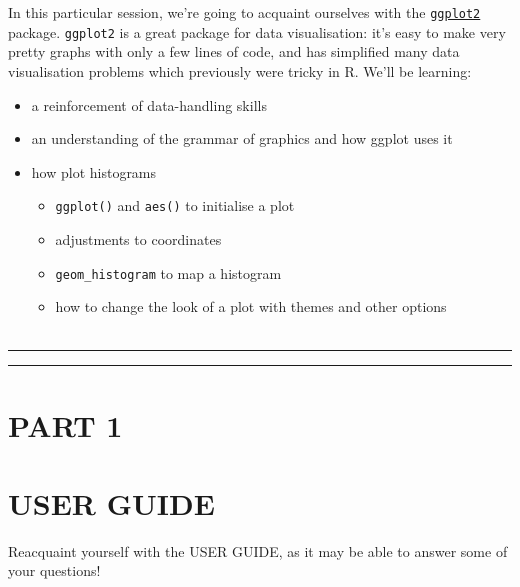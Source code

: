 \documentclass[
]{book}
\providecommand{\tightlist}{%
  \setlength{\itemsep}{0pt}\setlength{\parskip}{0pt}}
\begin{document}
In this particular session, we're going to acquaint ourselves with the
\href{https://ggplot2.tidyverse.org/}{\texttt{ggplot2}} package. \texttt{ggplot2} is a great
package for data visualisation: it's easy to make very pretty graphs with
only a few lines of code, and has simplified many data visualisation problems
which previously were tricky in R. We'll be learning:

\begin{itemize}
\tightlist
\item
  a reinforcement of data-handling skills
\item
  an understanding of the grammar of graphics and how ggplot uses it
\item
  how plot histograms

  \begin{itemize}
  \tightlist
  \item
    \texttt{ggplot()} and \texttt{aes()} to initialise a plot
  \item
    adjustments to coordinates
  \item
    \texttt{geom\_histogram} to map a histogram
  \item
    how to change the look of a plot with themes and other options\\
    ~\\
  \end{itemize}
\end{itemize}

\begin{center}\rule{0.5\linewidth}{\linethickness}\end{center}

\begin{center}\rule{0.5\linewidth}{\linethickness}\end{center}

\hypertarget{part-1}{%
\section{PART 1}\label{part-1}}

\hypertarget{user-guide}{%
\section{USER GUIDE}\label{user-guide}}

Reacquaint yourself with the USER GUIDE, as it may be able to answer some of
your questions!\\
~\\
\end{document}
